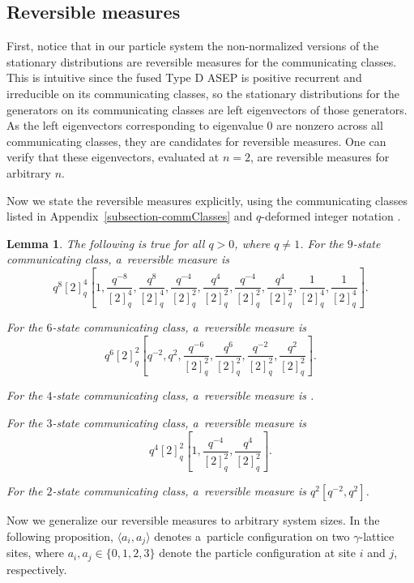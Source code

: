 \documentclass[pdftex]{sigma}
\numberwithin{equation}{section}
\newtheorem{Lemma}[Theorem]{Lemma}
\theoremstyle{definition}
\begin{document}
\subsection{Reversible measures} \label{subsection--StationaryDistr}

First, notice that in our particle system the non-normalized versions of the stationary distributions are reversible measures for the communicating classes. This is intuitive since the fused Type D ASEP is positive recurrent and irreducible on its communicating classes, so the stationary distributions for the generators on its communicating classes are left eigenvectors of those generators. As the left eigenvectors corresponding to eigenvalue 0 are nonzero across all communicating classes, they are candidates for reversible measures. One can verify that these eigenvectors, evaluated at $n=2$, are reversible measures for arbitrary $n$.

Now we state the reversible measures explicitly, using the communicating classes listed in Appendix~\ref{subsection-commClasses} and $q$-deformed integer notation .

\begin{Lemma}\label{allStationary} The following is true for all $q > 0$, where $q \neq 1$.
For the $9$-state communicating class, a~reversible measure is
\[q^8 [2]^4_q \left[1, \frac{q^{-8}}{[2]^4_q}, \frac{q^{8}}{[2]^4_q}, \frac{q^{-4}}{[2]^2_q}, \frac{q^{4}}{[2]^2_q}, \frac{q^{-4}}{[2]^2_q}, \frac{q^{4}}{[2]^2_q}, \frac{1}{[2]^4_q}, \frac{1}{[2]^4_q}\right].\]

For the $6$-state communicating class, a~reversible measure is
\[q^6 [2]^2_q \left[q^{-2}, q^2, \frac{q^{-6}}{[2]^2_q},\frac{q^{6}}{[2]^2_q}, \frac{q^{-2}}{[2]^2_q},\frac{q^{2}}{[2]^2_q} \right].\]

For the $4$-state communicating class, a~reversible measure is .

For the $3$-state communicating class, a~reversible measure is
\[q^4 [2]^2_q \left[1, \frac{q^{-4}}{[2]^2_q},\frac{q^{4}}{[2]^2_q} \right].\]

For the $2$-state communicating class, a~reversible measure is $q^2 \left[q^{-2}, q^2\right]$.
\end{Lemma}

Now we generalize our reversible measures to arbitrary system sizes. In the following proposition, $\langle a_i, a_j\rangle$ denotes a~particle configuration on two $\gamma$-lattice sites, where $a_i, a_j \in \{0,1,2,3\}$ denote the particle configuration at site $i$ and $j$, respectively.
\end{document}
